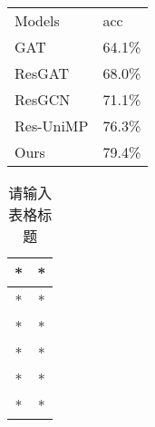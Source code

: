 

\begin{table}[]
\begin{tabular}{ll}
Models    & acc    \\
GAT       & 64.1\% \\
ResGAT    & 68.0\% \\
ResGCN    & 71.1\% \\
Res-UniMP & 76.3\% \\
Ours      & 79.4\%
\end{tabular}
\end{table}

\begin{table}[ht]
\centering
\caption{请输入表格标题}\label{tab_test121}
\begin{tabular}{|c|c|}
\hline
* & * \\
\hline
* & * \\
\hline
* & * \\
\hline
* & * \\
\hline
* & * \\
\hline
* & * \\
\hline
\end{tabular}
\end{table}